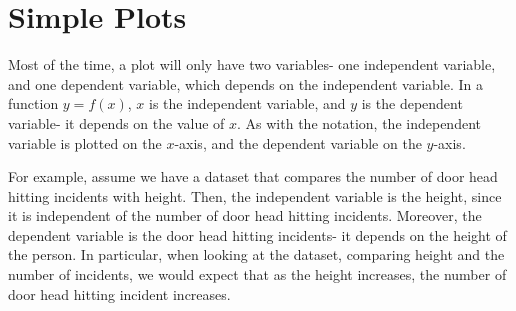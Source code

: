 \documentclass[a4paper, openany]{memoir}
\begin{document}
\section{Simple Plots}
Most of the time, a plot will only have two variables- one independent variable, and one dependent variable, which depends on the independent variable. In a function $y = f(x)$, $x$ is the independent variable, and $y$ is the dependent variable- it depends on the value of $x$. As with the notation, the independent variable is plotted on the $x$-axis, and the dependent variable on the $y$-axis.

For example, assume we have a dataset that compares the number of door head hitting incidents with height. Then, the independent variable is the height, since it is independent of the number of door head hitting incidents. Moreover, the dependent variable is the door head hitting incidents- it depends on the height of the person. In particular, when looking at the dataset, comparing height and the number of incidents, we would expect that as the height increases, the number of door head hitting incident increases.
\end{document}
